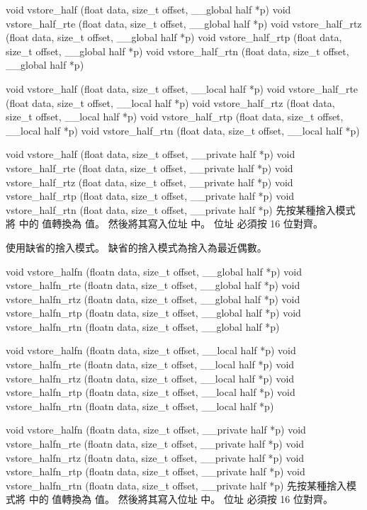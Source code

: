 void vstore_half (float data,
	size_t offset,
	__global half *p)
void vstore_half_rte (float data,
	size_t offset,
	__global half *p)
void vstore_half_rtz (float data,
	size_t offset,
	__global half *p)
void vstore_half_rtp (float data,
	size_t offset,
	__global half *p)
void vstore_half_rtn (float data,
	size_t offset,
	__global half *p)

void vstore_half (float data,
	size_t offset,
	__local half *p)
void vstore_half_rte (float data,
	size_t offset,
	__local half *p)
void vstore_half_rtz (float data,
	size_t offset,
	__local half *p)
void vstore_half_rtp (float data,
	size_t offset,
	__local half *p)
void vstore_half_rtn (float data,
	size_t offset,
	__local half *p)

void vstore_half (float data,
	size_t offset,
	__private half *p)
void vstore_half_rte (float data,
	size_t offset,
	__private half *p)
void vstore_half_rtz (float data,
	size_t offset,
	__private half *p)
void vstore_half_rtp (float data,
	size_t offset,
	__private half *p)
void vstore_half_rtn (float data,
	size_t offset,
	__private half *p)
\stopbuffer
{}
先按某種捨入模式將  中的  值轉換為  值。
然後將其寫入位址  中。
位址  必須按 16 位對齊。

 使用缺省的捨入模式。
缺省的捨入模式為捨入為最近偶數。
\stopbuffer

void vstore_halfn (floatn data,
	size_t offset,
	__global half *p)
void vstore_halfn_rte (floatn data,
	size_t offset,
	__global half *p)
void vstore_halfn_rtz (floatn data,
	size_t offset,
	__global half *p)
void vstore_halfn_rtp (floatn data,
	size_t offset,
	__global half *p)
void vstore_halfn_rtn (floatn data,
	size_t offset,
	__global half *p)

void vstore_halfn (floatn data,
	size_t offset,
	__local half *p)
void vstore_halfn_rte (floatn data,
	size_t offset,
	__local half *p)
void vstore_halfn_rtz (floatn data,
	size_t offset,
	__local half *p)
void vstore_halfn_rtp (floatn data,
	size_t offset,
	__local half *p)
void vstore_halfn_rtn (floatn data,
	size_t offset,
	__local half *p)

void vstore_halfn (floatn data,
	size_t offset,
	__private half *p)
void vstore_halfn_rte (floatn data,
	size_t offset,
	__private half *p)
void vstore_halfn_rtz (floatn data,
	size_t offset,
	__private half *p)
void vstore_halfn_rtp (floatn data,
	size_t offset,
	__private half *p)
void vstore_halfn_rtn (floatn data,
	size_t offset,
	__private half *p)
\stopbuffer
{}
先按某種捨入模式將  中的  值轉換為  值。
然後將其寫入位址  中。
位址  必須按 16 位對齊。

